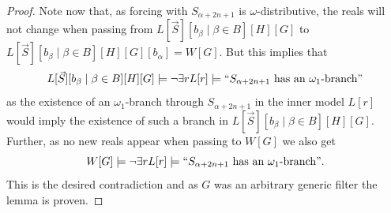 \documentclass[10pt,a4paper]{amsart}
\begin{document}
\begin{proof}
Note now that, as forcing with $S_{\alpha+2n+1}$ is $\omega$-distributive, the reals will not change when passing from $L[\vec{S} ] [b_{\beta} \mid \beta \in B] [H] [G]$ to
$L[\vec{S} ] [b_{\beta} \mid \beta \in B] [H] [G] [b_{\alpha}]=W[G]$. 
 But this implies that 
\[L[\vec{S} ] [b_{\beta} \mid \beta \in B] [H] [G] \models \lnot \exists r L[r] \models `` S_{\alpha+2n+1} \text{ has an $\omega_1$-branch}" \]
as the existence of an $\omega_1$-branch through $S_{\alpha+2n+1}$ in the inner model $L[r]$ would imply the existence of such a branch in $L[\vec{S} ] [b_{\beta} \mid \beta \in B] [H] [G]$. Further, as no new reals appear when passing to $W[G]$ we also get 
\[W[G] \models \lnot \exists r L[r] \models `` S_{\alpha+2n+1} \text{ has an $\omega_1$-branch}". \]
This is the desired contradiction and as $G$ was an arbitrary generic filter the lemma is proven.

\end{proof}
\end{document}
